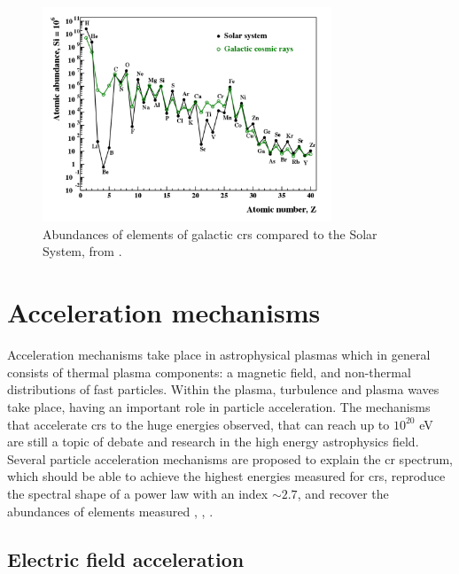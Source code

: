 \documentclass[main.tex]{subfiles}
\begin{document}
    \begin{figure}[h]
        \centering
        \includegraphics[width=0.77\textwidth]{Pictures/CRabundances.pdf}
        \caption{Abundances of elements of galactic \glspl{cr} compared to the Solar System, from \cite{2018particleacceleration}.}
        \label{fig:CRabundances}
    \end{figure}


\section{Acceleration mechanisms}

Acceleration mechanisms take place in astrophysical plasmas which in general consists of thermal plasma components: a magnetic field, and non-thermal distributions of fast particles. Within the plasma, turbulence and plasma waves take place, having an important role in particle acceleration.
The mechanisms that accelerate \glspl{cr} to the huge energies observed, that can reach up to $10^{20}$ eV are still a topic of debate and research in the high energy astrophysics field. Several particle acceleration mechanisms are proposed to explain the \gls{cr} spectrum, which should be able to achieve the highest energies measured for \glspl{cr}, reproduce the spectral shape of a power law with an index $\sim 2.7$, and recover the abundances of elements measured \cite{Hillas:1985is}, \cite{2008particleaccelerationmech}, \cite{2009accelerationmech}.

\subsection{Electric field acceleration}
\end{document}

